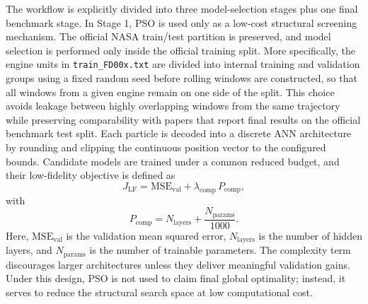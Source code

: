 The workflow is explicitly divided into three model-selection stages plus one final benchmark stage. In Stage 1, PSO is used only as a low-cost structural screening mechanism. The official NASA train/test partition is preserved, and model selection is performed only inside the official training split. More specifically, the engine units in \texttt{train\_FD00x.txt} are divided into internal training and validation groups using a fixed random seed before rolling windows are constructed, so that all windows from a given engine remain on one side of the split. This choice avoids leakage between highly overlapping windows from the same trajectory while preserving comparability with papers that report final results on the official benchmark test split. Each particle is decoded into a discrete ANN architecture by rounding and clipping the continuous position vector to the configured bounds. Candidate models are trained under a common reduced budget, and their low-fidelity objective is defined as
\begin{equation}
    J_{\mathrm{LF}} = \mathrm{MSE}_{\mathrm{val}} + \lambda_{\mathrm{comp}}\,P_{\mathrm{comp}},
    \label{eq:low_fidelity_objective}
\end{equation}
with
\begin{equation}
    P_{\mathrm{comp}} = N_{\mathrm{layers}} + \frac{N_{\mathrm{params}}}{1000}.
    \label{eq:complexity_penalty}
\end{equation}
Here, $\mathrm{MSE}_{\mathrm{val}}$ is the validation mean squared error, $N_{\mathrm{layers}}$ is the number of hidden layers, and $N_{\mathrm{params}}$ is the number of trainable parameters. The complexity term discourages larger architectures unless they deliver meaningful validation gains. Under this design, PSO is not used to claim final global optimality; instead, it serves to reduce the structural search space at low computational cost.

